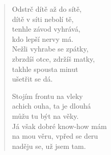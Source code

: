 \begin{multicols}{2}
\begin{verse}
Odstrč dítě až do sítě,\\
dítě v síti nebolí tě,\\
tenhle závod vyhrává,\\
kdo lepší nervy má.\\
Nežli vyhrabe se zpátky,\\
zbrzdíš otce, zdržíš matky,\\
takhle spousta minut\\
ušetřit se dá.

Stojím frontu na vleky\\
achich ouha, ta je dlouhá\\
můžu tu být na věky.\\
Já však dobré know-how mám\\
na mou věru, vpřed se deru\\
naděju se, už jsem tam.


\end{verse}


\end{multicols}